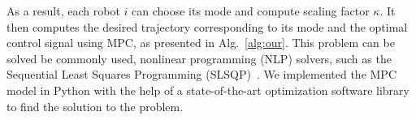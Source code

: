 As a result, each robot $i$ can choose its mode and compute scaling factor $\kappa$. It then computes the desired trajectory corresponding to its mode and the optimal control signal using MPC, as presented in Alg.~\ref{alg:our}. This problem can be solved be commonly used, nonlinear programming (NLP)
solvers, such as the Sequential Least Squares Programming (SLSQP)~\cite{kraft1988software}. We implemented the MPC model in Python with the help of a state-of-the-art optimization software library~\cite{2020SciPy-NMeth} to find the solution to the problem.